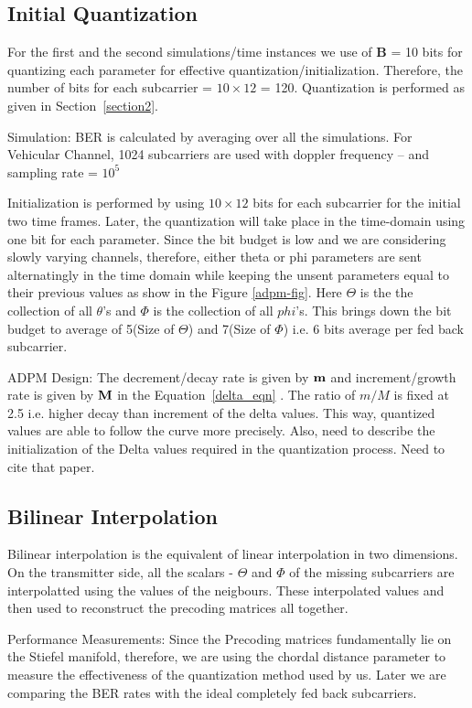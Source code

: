 \documentclass[conference]{IEEEtran}
\begin{document}
\subsection{Initial Quantization}
For the first and the second simulations/time instances we use of $\textbf{B}$ = 10 bits for quantizing each parameter for effective quantization/initialization. Therefore, the number of bits for each subcarrier = $10\times12$ = 120. Quantization is performed as given in Section~\ref{section2}.

Simulation: BER is calculated by averaging over all the simulations. For Vehicular Channel, 1024 subcarriers are used with doppler frequency – and sampling rate = $10^{5}$

Initialization is performed by using $10\times12$ bits for each subcarrier for the initial two time frames. Later, the quantization will take place in the time-domain using one bit for each parameter. Since the bit budget is low and we are considering slowly varying channels, therefore, either theta or phi parameters are sent alternatingly in the time domain while keeping the unsent parameters equal to their previous values as show in the Figure \ref{adpm-fig}. Here $\Theta$ is the the collection of all $\theta$'s and $\Phi$ is the collection of all $phi$'s. This brings down the bit budget to average of 5(Size of $\Theta$) and 7(Size of $\Phi$) i.e. 6 bits average per fed back subcarrier.

{ADPM Design}: The decrement/decay rate is given by ${\bf m}$ and increment/growth rate is given by ${\bf M}$ in the Equation~\ref{delta_eqn} . The ratio of $m/M$ is fixed at 2.5 i.e. higher decay than increment of the delta values. This way, quantized values are able to follow the curve more precisely. Also, need to describe the initialization of the Delta values required in the quantization process. Need to cite that paper.

\subsection{Bilinear Interpolation}
Bilinear interpolation is the equivalent of linear interpolation in two dimensions. On the transmitter side, all the scalars - $\Theta$ and $\Phi$ of the missing subcarriers are interpolatted using the values of the neigbours. These interpolated values and then used to reconstruct the precoding matrices all together.

Performance Measurements:
Since the Precoding matrices fundamentally lie on the Stiefel manifold, therefore, we are using the chordal distance parameter to measure the effectiveness of the quantization method used by us. Later we are comparing the BER rates with the ideal completely fed back subcarriers.
\end{document}
